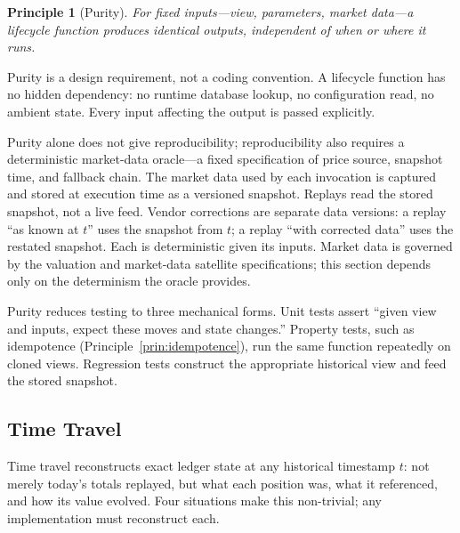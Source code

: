 \documentclass[11pt,a4paper]{article}
\newtheorem{principle}[definition]{Principle}
\begin{document}
\begin{principle}[Purity]
\label{prin:purity}
For fixed inputs---view, parameters, market data---a lifecycle function produces identical outputs, independent of when or where it runs.
\end{principle}

Purity is a design requirement, not a coding convention. A lifecycle function has no hidden dependency: no runtime database lookup, no configuration read, no ambient state. Every input affecting the output is passed explicitly.

Purity alone does not give reproducibility; reproducibility also requires a deterministic market-data oracle---a fixed specification of price source, snapshot time, and fallback chain. The market data used by each invocation is captured and stored at execution time as a versioned snapshot. Replays read the stored snapshot, not a live feed. Vendor corrections are separate data versions: a replay ``as known at $t$'' uses the snapshot from $t$; a replay ``with corrected data'' uses the restated snapshot. Each is deterministic given its inputs. Market data is governed by the valuation and market-data satellite specifications; this section depends only on the determinism the oracle provides.

Purity reduces testing to three mechanical forms. Unit tests assert ``given view and inputs, expect these moves and state changes.'' Property tests, such as idempotence (Principle~\ref{prin:idempotence}), run the same function repeatedly on cloned views. Regression tests construct the appropriate historical view and feed the stored snapshot.

\subsection{Time Travel}

Time travel reconstructs exact ledger state at any historical timestamp $t$: not merely today's totals replayed, but what each position was, what it referenced, and how its value evolved. Four situations make this non-trivial; any implementation must reconstruct each.
\end{document}
